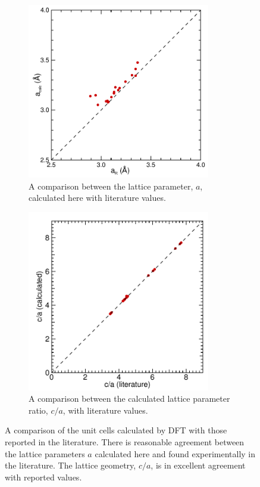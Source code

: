 \begin{figure}
\begin{subfigure}{\textwidth}

\centering
\captionsetup{width=10cm}
\includegraphics[width=8cm]{a_calc_vs_a_lit}
\caption[Calculated lattice parameters compared with literature values]{A comparison between the lattice parameter, $a$, calculated here with literature values.\label{fig:latt_params_DFT_vs_lit}}

\end{subfigure}

\begin{subfigure}{\textwidth}
\centering
\captionsetup{width=10cm}
\includegraphics[width=8cm]{c-a_calc_vs_lit}
\caption{A comparison between the calculated lattice parameter ratio, $c/a$, with literature values.\label{fig:c_a_ratio_DFT_vs_lit}}
\end{subfigure}

\caption[A comparison of the unit cells calculated by DFT with the literature.]{A comparison of the unit cells calculated by DFT with those reported in the literature. There is reasonable agreement between the lattice parameters $a$ calculated here and found experimentally in the literature. The lattice geometry, $c/a$, is in excellent agreement with reported values.\label{fig:unit_cells_DFT_vs_literature}}
\end{figure}



